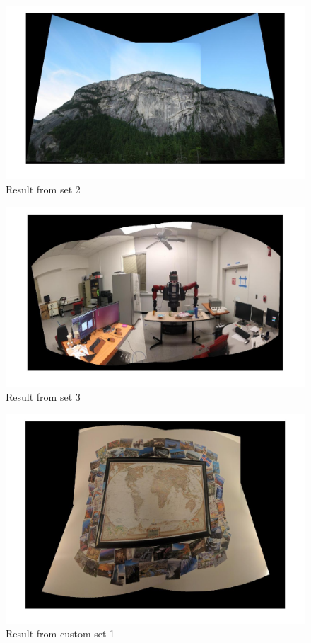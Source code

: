 \documentclass[12pt]{article}
\begin{document}
\begin{figure}[t!]
    \centering
    \includegraphics[width=\linewidth]{img/set2_panorama3}
    \caption{Result from set 2}
    \label{fig_result_2}
\end{figure}

\begin{figure}[t!]
    \centering
    \includegraphics[width=\linewidth]{img/set3_panorama1}
    \caption{Result from set 3}
    \label{fig_result_3}
\end{figure}

\begin{figure}[t!]
    \centering
    \includegraphics[width=\linewidth]{img/set_c1_pan2}
    \caption{Result from custom set 1}
    \label{fig_result_c1}
\end{figure}
\end{document}
